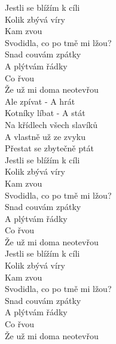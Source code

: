 \begin{multicols}{2}
{}
Jestli se  blížím k cíli\\
Kolik  zbývá víry\\
Kam  zvou\\
Svodidla, co po tmě mi  lžou? \\
Snad  couvám zpátky\\
A  plýtvám řádky \\
Co  řvou\\
Že už mi doma neotevřou \\

Ale  zpívat - A hrát\\
Kotníky  líbat - A stát\\
Na  křídlech všech slavíků\\
A vlastně už ze zvyku\\
 Přestat se zbytečně  ptát \\

Jestli se  blížím k cíli\\
Kolik  zbývá víry\\
Kam  zvou\\
Svodidla, co po tmě mi  lžou? \\
Snad  couvám zpátky\\
A  plýtvám řádky \\
Co  řvou\\
Že už mi doma neotevřou \\

Jestli se  blížím k cíli\\
Kolik  zbývá víry\\
Kam  zvou\\
Svodidla, co po tmě mi  lžou? \\
Snad  couvám zpátky\\
A  plýtvám řádky \\
Co  řvou\\
Že už mi doma neotevřou \\

\end{multicols}